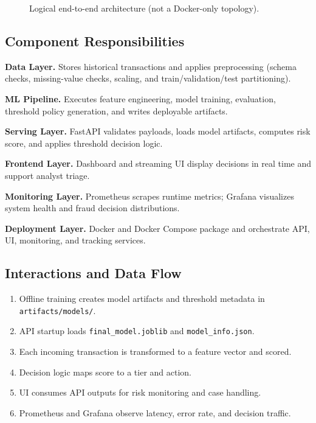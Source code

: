 \documentclass[11pt]{article}
\begin{document}
\begin{figure}[H]
\caption{Logical end-to-end architecture (not a Docker-only topology).}
\label{fig:logical_architecture}
\end{figure}

\subsection{Component Responsibilities}
\textbf{Data Layer.} Stores historical transactions and applies preprocessing (schema checks, missing-value checks, scaling, and train/validation/test partitioning).

\textbf{ML Pipeline.} Executes feature engineering, model training, evaluation, threshold policy generation, and writes deployable artifacts.

\textbf{Serving Layer.} FastAPI validates payloads, loads model artifacts, computes risk score, and applies threshold decision logic.

\textbf{Frontend Layer.} Dashboard and streaming UI display decisions in real time and support analyst triage.

\textbf{Monitoring Layer.} Prometheus scrapes runtime metrics; Grafana visualizes system health and fraud decision distributions.

\textbf{Deployment Layer.} Docker and Docker Compose package and orchestrate API, UI, monitoring, and tracking services.

\subsection{Interactions and Data Flow}
\begin{enumerate}
\item Offline training creates model artifacts and threshold metadata in \texttt{artifacts/models/}.
\item API startup loads \texttt{final\_model.joblib} and \texttt{model\_info.json}.
\item Each incoming transaction is transformed to a feature vector and scored.
\item Decision logic maps score to a tier and action.
\item UI consumes API outputs for risk monitoring and case handling.
\item Prometheus and Grafana observe latency, error rate, and decision traffic.
\end{enumerate}
\end{document}
